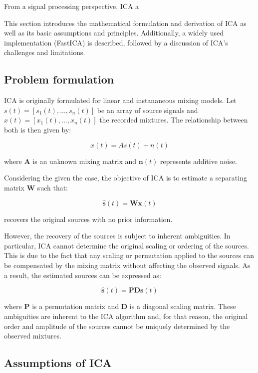 From a signal processing perspective, ICA a

This section introduces the mathematical formulation and derivation of ICA as well as its basic assumptions and principles. Additionally, a widely used implementation (FastICA) is described, followed by a discussion of ICA's challenges and limitations.
\subsection{Problem formulation}
ICA is originally formulated for linear and instananeous mixing models. Let $s(t)=[s_1(t),...,s_n(t)]$ be an array of source signals and $x(t)=[x_1(t),...,x_n(t)]$ the recorded mixtures. The relationship between both is then given by:

\begin{equation}
    x(t)=As(t)+n(t)
\end{equation}

\noindent where $\mathbf{A}$ is an unknown mixing matrix and  $\mathbf{n}(t)$ represents additive noise.

Considering the given the case, the objective of ICA is to estimate a separating matrix $\mathbf{W}$ such that:

\begin{equation}
    \hat{\mathbf{s}}(t) = \mathbf{W} \mathbf{x}(t)
\end{equation}

\noindent recovers the original sources with no prior information. 

However, the recovery of the sources is subject to inherent ambiguities. In particular, ICA cannot determine the original scaling or ordering of the sources. This is due to the fact that any scaling or permutation applied to the sources can be compensated by the mixing matrix without affecting the observed signals. As a result, the estimated sources can be expressed as:

\begin{equation}
    \hat{\mathbf{s}}(t) = \mathbf{P} \mathbf{D} \mathbf{s}(t)
\end{equation}

\noindent where $\mathbf{P}$ is a permutation matrix and $\mathbf{D}$ is a diagonal scaling matrix. These ambiguities are inherent to the ICA algorithm and, for that reason, the original order and amplitude of the sources cannot be uniquely determined by the observed mixtures.


\subsection{Assumptions of ICA}

